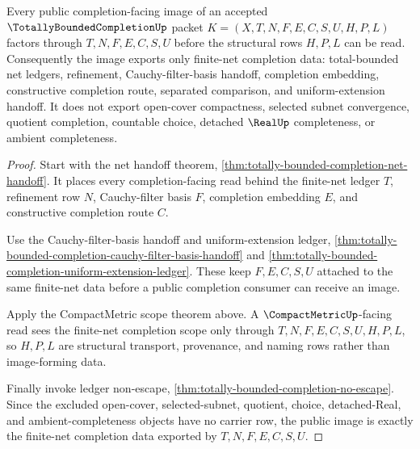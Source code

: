 \begin{theorem}
\label{thm:totally-bounded-completion-net-completion-image}
Every public completion-facing image of an accepted $\TotallyBoundedCompletionUp$ packet $K=(X,T,N,F,E,C,S,U,H,P,L)$ factors through $T,N,F,E,C,S,U$ before the structural rows $H,P,L$ can be read. Consequently the image exports only finite-net completion data: total-bounded net ledgers, refinement, Cauchy-filter-basis handoff, completion embedding, constructive completion route, separated comparison, and uniform-extension handoff. It does not export open-cover compactness, selected subnet convergence, quotient completion, countable choice, detached $\RealUp$ completeness, or ambient completeness.
\end{theorem}
\begin{proof}
Start with the net handoff theorem, \autoref{thm:totally-bounded-completion-net-handoff}. It places every completion-facing read behind the finite-net ledger $T$, refinement row $N$, Cauchy-filter basis $F$, completion embedding $E$, and constructive completion route $C$.

Use the Cauchy-filter-basis handoff and uniform-extension ledger, \autoref{thm:totally-bounded-completion-cauchy-filter-basis-handoff} and \autoref{thm:totally-bounded-completion-uniform-extension-ledger}. These keep $F,E,C,S,U$ attached to the same finite-net data before a public completion consumer can receive an image.

Apply the CompactMetric scope theorem above. A $\CompactMetricUp$-facing read sees the finite-net completion scope only through $T,N,F,E,C,S,U,H,P,L$, so $H,P,L$ are structural transport, provenance, and naming rows rather than image-forming data.

Finally invoke ledger non-escape, \autoref{thm:totally-bounded-completion-no-escape}. Since the excluded open-cover, selected-subnet, quotient, choice, detached-Real, and ambient-completeness objects have no carrier row, the public image is exactly the finite-net completion data exported by $T,N,F,E,C,S,U$.
\end{proof}

